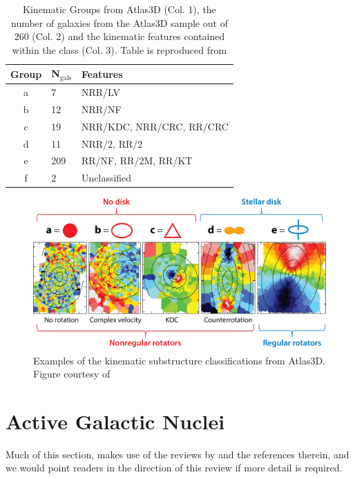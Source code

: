 	\begin{table}
		\centering
		\caption{Kinematic Groups from Atlas3D (Col. 1), the number of galaxies from the Atlas3D sample out of 260 (Col. 2) and the kinematic features contained within the class (Col. 3). Table is reproduced from \citep{Krajnovic2011}}
		\label{tab:KinGroups}
		\begin{tabular}{c l l}
			\hline
			\hline
			Group 	& N$_\text{gals}$ & Features \\
			\hline
			a 		& 7			& NRR/LV \\
			b 		& 12		& NRR/NF \\
			c 		& 19		& NRR/KDC, NRR/CRC, RR/CRC \\
			d 		& 11		& NRR/2\textsigma, RR/2\textsigma \\
			e 		& 209		& RR/NF, RR/2M, RR/KT \\
			f 		& 2			& Unclassified \\
			\hline
			\hline
		\end{tabular}
	\end{table}

	\begin{figure}
		\centering
		\includegraphics[width=\textwidth]{introduction/substructure.jpeg}
		\caption[Examples of the kinematic substructure classifications]{Examples of the kinematic substructure classifications from Atlas3D. Figure courtesy of \citet{Cappellari2016}}
		\label{fig:EgSubstructure}
	\end{figure}



\section{Active Galactic Nuclei}
	\label{sec:AGN}
	Much of this section, makes use of the reviews by \citet{Fabian2012, Heckman2014} and the references therein, and we would point readers in the direction of this review if more detail is required. 

